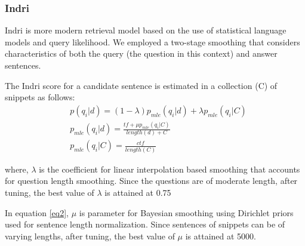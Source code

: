 \documentclass[11pt,a4paper]{article}
\begin{document}



\subsubsection{Indri}

Indri \cite{Indri} is more modern retrieval model based on the use of statistical language models and query likelihood. 
We employed a two-stage smoothing that considers characteristics of both the query (the question in this context) and answer sentences. 

The Indri score for a candidate sentence is estimated in a collection (C) of snippets as follows:
\begin{align}
    & p(q_i|d) = (1-\lambda) p_{mle} (q_i|d) + \lambda p_{mle} (q_i|C) \label{eq1} \\ 
    & p_{mle}(q_i|d) = 
    \frac{tf + \mu  p_{mle}(q_i|C)}{length(d) + C} \label{eq2} \\ 
    & p_{mle}(q_i | C) = \frac{ctf}{length(C)}
\end{align}

where, $\lambda$ is the coefficient for linear interpolation based smoothing that accounts for question length smoothing. Since the questions are of moderate length, after tuning, the best value of $\lambda$ is attained at 0.75

In equation \ref{eq2}, $\mu$ is parameter for Bayesian smoothing using Dirichlet priors used for sentence length normalization. Since sentences of snippets can be of varying lengths, after tuning, the best value of $\mu$ is attained at 5000.
\end{document}
